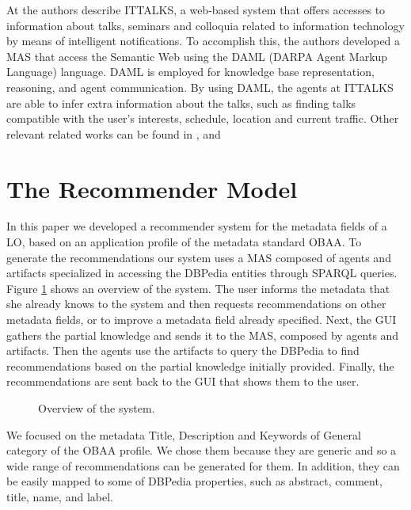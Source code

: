 \documentclass[a4paper,twoside]{article}
\begin{document}
At \cite{refA} the authors describe ITTALKS, a web-based system that offers accesses to information about talks, seminars and colloquia related to information technology by means of intelligent notifications. To accomplish this, the authors developed a MAS that access the Semantic Web using the DAML (DARPA Agent Markup Language) language. DAML is employed for knowledge base representation, reasoning, and agent communication. By using DAML, the agents at ITTALKS are able to infer extra information about the talks, such as finding talks compatible with the user's interests, schedule, location and current traffic. Other relevant related works can be found in \cite{refD}, \cite{refE} and \cite{refF}

\section{The Recommender Model}

\noindent In this paper we developed a recommender system for the metadata fields of a LO, based on an application profile of the metadata standard OBAA. To generate the recommendations our system uses a MAS composed of agents and artifacts specialized in accessing the DBPedia entities through SPARQL queries. Figure \ref{fig:new1} shows an overview of the system. The user informs the metadata that she already knows to the system and then requests recommendations on other metadata fields, or to improve a metadata field already specified. Next, the GUI gathers the partial knowledge and sends it to the MAS, composed by agents and artifacts. Then the agents use the artifacts to query the DBPedia to find recommendations based on the partial knowledge initially provided. Finally, the recommendations are sent back to the GUI that shows them to the user.

\begin{figure}[!h]
  \centering
   {}
  \caption{Overview of the system.}
  \label{fig:new1}
 \end{figure}

We focused on the metadata Title, Description and Keywords of General category of the OBAA profile. We chose them because they are generic and so a wide range of recommendations can be generated for them. In addition, they can be easily mapped to some of DBPedia properties, such as abstract, comment, title, name, and label.
\end{document}
